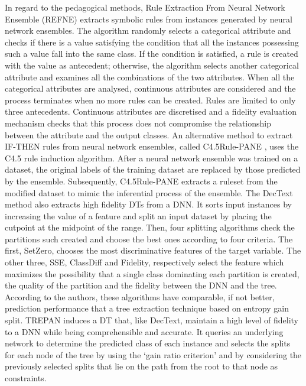 \documentclass[final,1p,times]{elsarticle}
\begin{document}
In regard to the pedagogical methods, Rule Extraction From Neural Network Ensemble (REFNE) \cite{zhou2003extracting} extracts symbolic rules from instances generated by neural network ensembles. The algorithm randomly selects a categorical attribute and checks if there is a value satisfying the condition that all the instances possessing such a value fall into the same class. If the condition is satisfied, a rule is created with the value as antecedent; otherwise, the algorithm selects another categorical attribute and examines all the combinations of the two attributes. When all the categorical attributes are analysed, continuous attributes are considered and the process terminates when no more rules can be created. Rules are limited to only three antecedents. Continuous attributes are discretised and a fidelity evaluation mechanism checks that this process does not compromise the relationship between the attribute and the output classes. An alternative method to extract IF-THEN rules from neural network ensembles, called C4.5Rule-PANE \cite{zhou2003medical}, uses the C4.5 rule induction algorithm. After a neural network ensemble was trained on a dataset, the original labels of the training dataset are replaced by those predicted by the ensemble. Subsequently, C4.5Rule-PANE extracts a ruleset from the modified dataset to mimic the inferential process of the ensemble.
The DecText method \cite{boz2002extracting} also extracts high fidelity DTs from a DNN. It sorts input instances by increasing the value of a feature and split an input dataset by placing the cutpoint at the midpoint of the range. Then, four splitting algorithms check the partitions such created and choose the best ones according to four criteria. The first, SetZero, chooses the most discriminative features of the target variable. The other three, SSE, ClassDiff and Fidelity, respectively select the feature which maximizes the possibility that a single class dominating each partition is created, the quality of the partition and the fidelity between the DNN and the tree. According to the authors, these algorithms have comparable, if not better, prediction performance that a tree extraction technique based on entropy gain split. TREPAN \cite{craven1994using, craven1996extracting} induces a DT that, like DecText, maintain a high level of fidelity to a DNN while being comprehensible and accurate. It queries an underlying network to determine the predicted class of each instance and selects the splits for each node of the tree by using the `gain ratio criterion' and by considering the previously selected splits that lie on the path from the root to that node as constraints.
\end{document}
